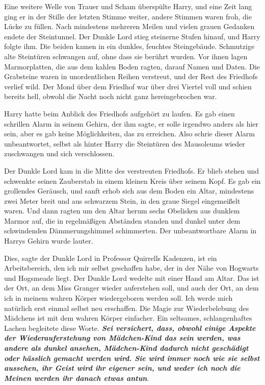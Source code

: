 Eine weitere Welle von Trauer und Scham überspülte Harry, und eine Zeit lang
ging er in der Stille der letzten Stimme weiter, andere Stimmen waren froh, die
Lücke zu füllen. Nach mindestens mehreren Meilen und vielen grauen Gedanken
endete der Steintunnel. Der Dunkle Lord stieg steinerne Stufen hinauf, und Harry
folgte ihm. Die beiden kamen in ein dunkles, feuchtes Steingebäude. Schmutzige
alte Steintüren schwangen auf, ohne dass sie berührt wurden. Vor ihnen lagen
Marmorplatten, die aus dem kahlen Boden ragten, darauf Namen und Daten. Die
Grabsteine waren in unordentlichen Reihen verstreut, und der Rest des Friedhofs
verlief wild. Der Mond über dem Friedhof war über drei Viertel voll und schien
bereits hell, obwohl die Nacht noch nicht ganz hereingebrochen war.

Harry hatte beim Anblick des Friedhofs aufgehört zu laufen. Es gab einen
schrillen Alarm in seinem Gehirn, der ihm sagte, er solle irgendwo anders als
hier sein, aber es gab keine Möglichkeiten, das zu erreichen. Also schrie dieser
Alarm unbeantwortet, selbst als hinter Harry die Steintüren des Mausoleums
wieder zuschwangen und sich verschlossen.

Der Dunkle Lord kam in die Mitte des verstreuten Friedhofs. Er blieb stehen und
schwenkte seinen Zauberstab in einem kleinen Kreis über seinem Kopf. Es gab ein
grollendes Geräusch, und sanft erhob sich aus dem Boden ein Altar, mindestens
zwei Meter breit und aus schwarzem Stein, in den graue Siegel eingemeißelt
waren. Und dann ragten um den Altar herum sechs Obelisken aus dunklem Marmor
auf, die in regelmäßigen Abständen standen und dunkel unter dem schwindenden
Dämmerungshimmel schimmerten. Der unbeantwortbare Alarm in Harrys Gehirn wurde
lauter.

\glqq{}Dies\grqq{}, sagte der Dunkle Lord in Professor Quirrells Kadenzen, \glqq{}
ist ein Arbeitsbereich, den ich mir selbst geschaffen habe, der in der Nähe von
Hogwarts und Hogsmeade liegt.\grqq{} Der Dunkle Lord wedelte mit einer Hand am Altar.
\glqq{}Das ist der Ort, an dem Miss Granger wieder auferstehen soll, und auch der
Ort, an dem ich in meinem wahren Körper wiedergeboren werden soll. Ich werde
mich natürlich erst einmal selbst neu erschaffen. Die Magie zur Wiederbelebung
des Mädchens ist mit dem wahren Körper einfacher.\grqq{} Ein seltsames,
schlangenhaftes Lachen begleitete diese Worte. \glqq{}\textbf{\emph{Sei
versichert, dass, obwohl einige Aspekte der Wiederauferstehung von Mädchen-Kind
das sein werden, was andere als dunkel ansehen, Mädchen-Kind dadurch nicht
geschädigt oder hässlich gemacht werden wird. Sie wird immer noch wie sie selbst
aussehen, ihr Geist wird ihr eigener sein, und weder ich noch die Meinen werden
ihr danach etwas antun}}.\grqq{}

